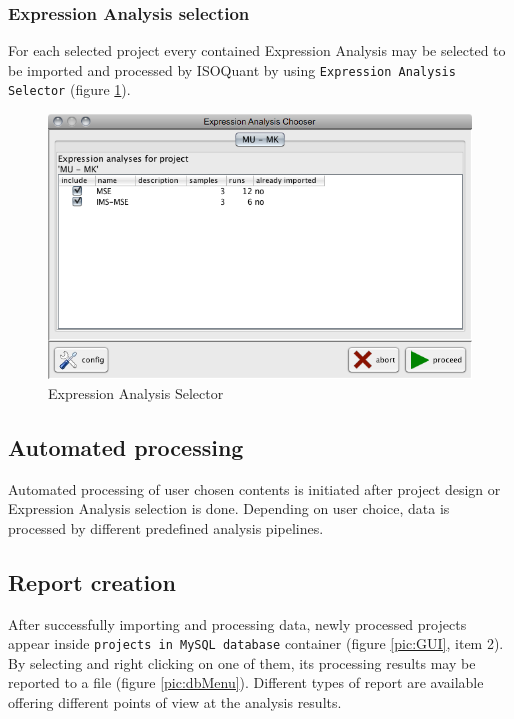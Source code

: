 \documentclass[]{article}
\makeatletter
\def\maxwidth{\ifdim\Gin@nat@width>\linewidth\linewidth
\else\Gin@nat@width\fi}
\let\Oldincludegraphics\includegraphics
\renewcommand{\includegraphics}[1]{\Oldincludegraphics[width=\maxwidth]{#1}}
\makeatother
\begin{document}
\subsubsection{Expression Analysis selection}

For each selected project every contained Expression Analysis may be
selected to be imported and processed by ISOQuant by using
\lstinline!Expression Analysis Selector! (figure \ref{pic:eaSelector}).

\begin{figure}[htbp]
\centering
\includegraphics{assets/isoquant/pics/expression_analysis_selector.png}
\caption{Expression Analysis Selector \label{pic:eaSelector}}
\end{figure}

\subsection{Automated processing}

Automated processing of user chosen contents is initiated after project
design or Expression Analysis selection is done. Depending on user
choice, data is processed by different predefined analysis pipelines.

\subsection{Report creation}

After successfully importing and processing data, newly processed
projects appear inside \lstinline!projects in MySQL database! container
(figure \ref{pic:GUI}, item 2). By selecting and right clicking on one
of them, its processing results may be reported to a file (figure
\ref{pic:dbMenu}). Different types of report are available offering
different points of view at the analysis results.
\end{document}
